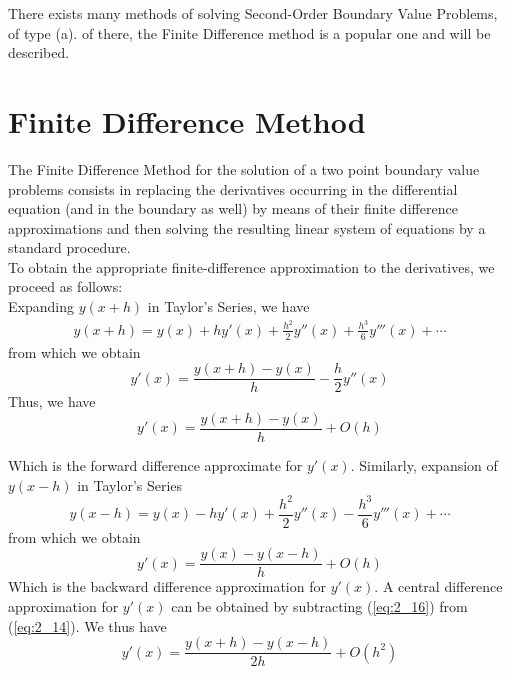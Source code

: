 \documentclass[12pt]{report}
\newcommand{\sps}{\\[0.2cm]}
\newcommand{\refn}[1]{(\ref{#1})}
\newcommand{\refx}[1]{\refn{eq:#1}}
\newcommand{\NI}{\noindent}
\newcommand{\sprime}{'}
\newcommand{\dprime}{''}
\newcommand{\tprime}{'''}
\begin{document}
	\NI There exists many methods of solving Second-Order Boundary Value Problems, of type (a). of there, the Finite Difference method is a popular one and will be described.
	
	\section{Finite Difference Method}
	The Finite Difference Method for the solution of a two point boundary value problems consists in replacing the derivatives occurring in the differential equation (and in the boundary as well) by means of their finite difference approximations and then solving the resulting linear system of equations by a standard procedure.\sps
	
	\NI To obtain the appropriate finite-difference approximation to the derivatives, we proceed as follows:\sps
	Expanding $y(x+h)$ in Taylor's Series, we have
	\begin{eqnarray}
		y(x+h) = y(x) + hy\sprime(x) + \frac{h^2}{2}y\dprime(x) + \frac{h^3}{6}y\tprime(x) + \cdots \label{eq:2_14}
	\end{eqnarray}
	from which we obtain
	\begin{equation*}
		y\sprime(x) = \frac{y(x+h) - y(x)}{h} - \frac{h}{2}y\dprime(x)
	\end{equation*}
	Thus, we have
	\begin{equation}
		y\sprime(x) = \frac{y(x+h) - y(x)}{h} + O(h) \label{eq:2_15}
	\end{equation}
	
	\NI Which is the forward difference approximate for $y\sprime(x)$. Similarly, expansion of $y(x-h)$ in Taylor's Series
	\begin{equation}
		y(x-h) = y(x) - hy\sprime(x) + \frac{h^2}{2}y\dprime(x) - \frac{h^3}{6}y\tprime(x) + \cdots \label{eq:2_16}
	\end{equation}
	from which we obtain
	\begin{equation}
		y\sprime(x) = \frac{y(x) - y(x-h)}{h} + O(h) \label{eq:2_17}
	\end{equation}
	Which is the backward difference approximation for $y\sprime(x)$. A central difference approximation for $y\sprime(x)$ can be obtained by subtracting \refx{2_16} from \refx{2_14}. We thus have
	\begin{equation}
		y\sprime(x) = \frac{y(x+h) - y(x-h)}{2h} + O(h^2) \label{eq:2_18}
	\end{equation}
	
\end{document}
